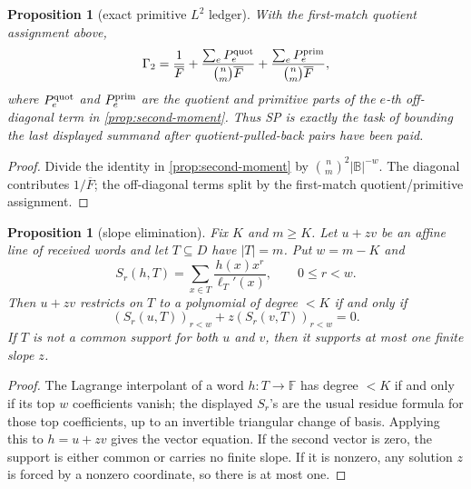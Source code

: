 \documentclass[a4paper,11pt]{amsart}
\newtheorem{proposition}[theorem]{Proposition}
\theoremstyle{remark}
\newcommand{\F}{\mathbb F}
\newcommand{\B}{\mathbb B}
\begin{document}
\begin{proposition}[exact primitive \(L^2\) ledger]\label{prop:gamma2-ledger}
With the first-match quotient assignment above,
\[
        \Gamma_2
        =
        \frac{1}{\overline F}
        +\frac{\sum_e P_e^{\rm quot}}{\binom{n}{m}\overline F}
        +\frac{\sum_e P_e^{\rm prim}}{\binom{n}{m}\overline F},
\]
where \(P_e^{\rm quot}\) and \(P_e^{\rm prim}\) are the quotient and primitive parts of the \(e\)-th off-diagonal term in \cref{prop:second-moment}.  Thus SP is exactly the task of bounding the last displayed summand after quotient-pulled-back pairs have been paid.
\end{proposition}

\begin{proof}
Divide the identity in \cref{prop:second-moment} by \(\binom{n}{m}^2|\B|^{-w}\).  The diagonal contributes \(1/\overline F\); the off-diagonal terms split by the first-match quotient/primitive assignment.
\end{proof}

\begin{proposition}[slope elimination]\label{prop:slope-elimination}
Fix \(K\) and \(m\ge K\).  Let \(u+zv\) be an affine line of received words and let \(T\subseteq D\) have \(|T|=m\).  Put \(w=m-K\) and
\[
        S_r(h,T)=\sum_{x\in T}\frac{h(x)x^r}{\ell_T'(x)},\qquad 0\le r<w.
\]
Then \(u+zv\) restricts on \(T\) to a polynomial of degree \(<K\) if and only if
\[
        (S_r(u,T))_{r<w}+z(S_r(v,T))_{r<w}=0.
\]
If \(T\) is not a common support for both \(u\) and \(v\), then it supports at most one finite slope \(z\).
\end{proposition}

\begin{proof}
The Lagrange interpolant of a word \(h:T\to\F\) has degree \(<K\) if and only if its top \(w\) coefficients vanish; the displayed \(S_r\)'s are the usual residue formula for those top coefficients, up to an invertible triangular change of basis.  Applying this to \(h=u+zv\) gives the vector equation.  If the second vector is zero, the support is either common or carries no finite slope.  If it is nonzero, any solution \(z\) is forced by a nonzero coordinate, so there is at most one.
\end{proof}
\end{document}
